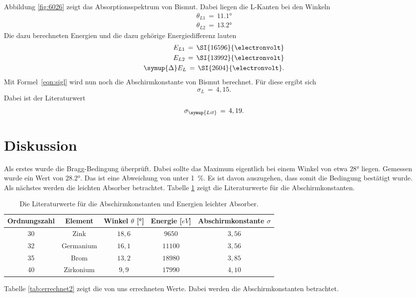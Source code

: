 \documentclass[
  bibliography=totoc,     %
  captions=tableheading,  %
  titlepage=firstiscover, %
]{scrartcl}
\begin{document}
\noindent
Abbildung \ref{fig:6026} zeigt das Absorptionsspektrum von Bismut. Dabei liegen die L-Kanten bei den Winkeln
\begin{align*}
  \theta_{L1}\,=\,11.1° \\
  \theta_{L2}\,=\,13.2°
\end{align*}
Die dazu berechneten Energien und die dazu gehörige Energiedifferenz lauten
\begin{align*}
  E_{L1}\,=\,\SI{16596}{\electronvolt} \\
  E_{L2}\,=\,\SI{13992}{\electronvolt} \\
  \symup{\Delta} E_L\,=\,\SI{2604}{\electronvolt}.
\end{align*}
Mit Formel~\eqref{eqn:sigl} wird nun noch die Abschirmkonstante von Bismut berechnet. Für diese ergibt sich
\begin{equation*}
  \sigma_L\,=\,4,15.
\end{equation*}
Dabei ist der Literaturwert
\begin{equation*}
  \sigma_{\symup{Lit}}\,=\,4,19.
\end{equation*}
\newpage
\section{Diskussion}
\label{sec:diskussion}
Als erstes wurde die Bragg-Bedingung überprüft. Dabei sollte das Maximum eigentlich bei einem Winkel von etwa $28°$ liegen. Gemessen wurde ein Wert von $28.2°$. Das ist eine Abweichung von unter \SI{1}{\percent}. Es ist davon auszugehen, dass somit die Bedingung bestätigt wurde.
Als nächstes werden die leichten Absorber betrachtet. Tabelle \ref{tab:literaturwerte} zeigt die Literaturwerte \cite{wissen} für die Abschirmkonstanten.
\begin{table}[H]
	\begin{center}
	\caption{Die Literaturwerte für die Abschirmkonstanten und Energien leichter Absorber.}
	\label{tab:literaturwerte}
		\begin{tabular}{ccccc}
			\toprule
			{Ordnungszahl} & {Element} & {Winkel $\theta$ [°]} & {Energie [$eV$]}
      & {Abschirmkonstante $\sigma$}\\
			\midrule
			30  & Zink & $18,6$ & $9650$ & $3,56$ \\
			32  & Germanium & $16,1$ & $11100$ & $3,56$\\
			35  & Brom & $13,2$ & $18980$ & $3,85$ \\
			40  & Zirkonium & $9,9$ & $17990$ & $4,10$ \\
			\bottomrule
		\end{tabular}
	\end{center}
\end{table}
\noindent
Tabelle \ref{tab:errechnet2} zeigt die von uns errechneten Werte. Dabei werden die Abschirmkonstanten betrachtet.
\end{document}
